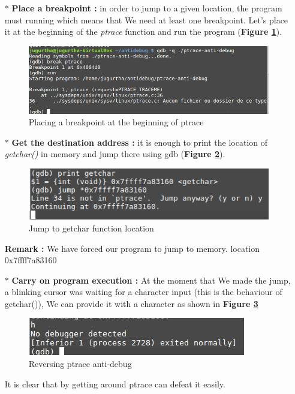 \begin{itemize}
	\item[$\ast$] \textbf{Place a breakpoint :} in order to jump to a given location, the program must running which means that We need at least one breakpoint. Let's place it at the beginning of the \emph{ptrace} function and run the program (\textbf{Figure \ref{Placing a breakpoint at the beginning of ptrace}}).
			\begin{figure}[H]
					\centering
        			\includegraphics[scale=0.45]{img/solution/ptrace-reverse-anti-debug.png}
        			\caption{Placing a breakpoint at the beginning of ptrace}
        			\label{Placing a breakpoint at the beginning of ptrace}
   			 \end{figure}
		
	
	\item[$\ast$] \textbf{Get the destination address : } it is enough to print the location of \emph{getchar()} in memory and jump there using gdb (\textbf{Figure \ref{Jump to getchar function location}}).
	\begin{figure}[H]
					\centering
        			\includegraphics[scale=0.45]{img/solution/jumpMadeUsingGDB.png}
        			\caption{Jump to getchar function location}
        			\label{Jump to getchar function location}
   			 \end{figure}
\textbf{\color{orange}Remark :} We have forced our program to jump to memory. location 0x7ffff7a83160	
	\item[$\ast$] \textbf{Carry on program execution : } At the moment that We made the jump, a blinking cursor was waiting for a character input (this is the behaviour of getchar()), We can provide it with a character as shown in \textbf{Figure \ref{Reversing ptrace anti-debug}}
			\begin{figure}[H]
					\centering
        			\includegraphics[scale=0.45]{img/solution/reverse-engineering-debugged.png}
        			\caption{Reversing ptrace anti-debug}
        			\label{Reversing ptrace anti-debug}
   			 \end{figure}
	It is clear that by getting around ptrace can defeat it easily.
	
\end{itemize}





